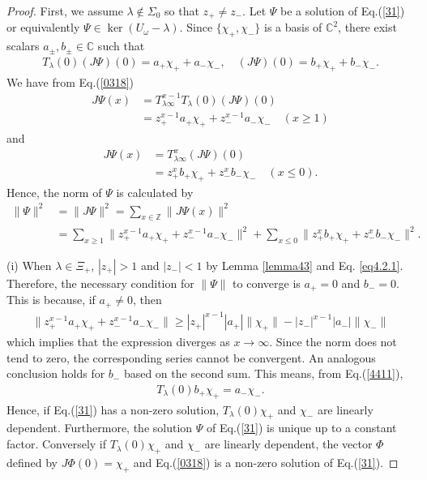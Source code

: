 \documentclass[a4paper,12pt]{article}
\theoremstyle{plain}
\theoremstyle{definition}
\theoremstyle{definition}
\begin{document}
\begin{proof}
First, we assume $\lambda \notin \Sigma_0$ so that $z_+ \neq z_-$. Let $\Psi $ be a solution of Eq.(\ref{31}) or equivalently $\Psi \in \ker (U_{\omega}-\lambda)$. Since $\{ \chi_+ ,\chi_- \}$ is a basis of $\mathbb{C}^2$, there exist scalars $a_{\pm}, b_{\pm} \in \mathbb{C}$ such that 
\begin{align}
\label{4411}
    T_{\lambda}(0)(J\Psi)(0) =a_{+} \chi_{+} +a_{-}\chi_{-}, \quad (J\Psi)(0) =b_{+} \chi_{+} +b_{-}\chi_{-}.
\end{align}
We have from Eq.(\ref{0318})
\begin{align*}
    J\Psi (x) &= T_{\lambda \infty }^{x-1}T_{\lambda}(0)(J\Psi)(0)\nonumber \\
    &=z_{+}^{x-1} a_{+} \chi_{+} +z_{-} ^{x-1}a_{-}\chi_{-} \quad (x \geq 1)
\end{align*}
and
\begin{align*}
    J\Psi (x) &= T_{\lambda \infty }^{x}(J\Psi)(0)\nonumber \\
    &=z_{+}^{x} b_{+} \chi_{+} +z_{-} ^{x}b_{-}\chi_{-} \quad (x \leq 0).
\end{align*}
Hence, the norm of $\Psi$ is calculated by 
\begin{align*}
    \| \Psi \|^2 &= \| J\Psi \|^2 = \sum_{x\in \mathbb{Z}}\| J\Psi (x) \|^2 \\
    &=\sum_{x \geq 1} \| z_{+}^{x-1} a_{+} \chi_{+} +z_{-} ^{x-1}a_{-}\chi_{-} \|^2 + \sum_{x \leq 0} \| z_{+}^{x} b_{+} \chi_{+} +z_{-} ^{x}b_{-}\chi_{-} \|^2.
\end{align*}

(i) When $\lambda \in \Xi_+$, $|z_+|>1$ and $|z_-|<1$ by Lemma \ref{lemma43} and Eq. \eqref{eq4.2.1}. Therefore, the necessary condition for $\| \Psi \|$ to converge is $a_+=0$ and $b_-=0$. This is because, if $a_+ \neq 0$, then
\begin{align*}
\|z_{+}^{x-1}a_+\chi_+ + z_{-}^{x-1}a_-\chi_- \| \geq |z_{+}|^{x-1}|a_+|\|\chi_+ \| - |z_{-}|^{x-1}|a_-|\|\chi_- \|
\end{align*}
which implies that the expression diverges as $x \to \infty$. Since the norm does not tend to zero, the corresponding series cannot be convergent. An analogous conclusion holds for $b_-$ based on the second sum. This means, from Eq.(\ref{4411}),
\begin{align*}
    T_{\lambda}(0)b_+\chi_+=a_- \chi_-.
\end{align*}
Hence, if Eq.(\ref{31}) has a non-zero solution, $T_{\lambda}(0)\chi_+$ and $\chi_-$ are linearly dependent. Furthermore, the solution $\Psi$ of Eq.(\ref{31}) is unique up to a constant factor.  Conversely if $T_{\lambda}(0)\chi_+$ and $\chi_-$ are linearly dependent, the vector $\Phi$ defined by $J\Phi (0)=\chi_+$ and Eq.(\ref{0318}) is a non-zero solution of Eq.(\ref{31}).


\end{proof}
\end{document}
